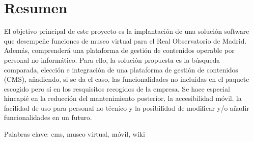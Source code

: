 \section{Resumen}

\par El objetivo principal de este proyecto es la implantación de una solución software que desempeñe funciones de museo virtual para el Real Observatorio de Madrid. Además, comprenderá una plataforma de gestión de contenidos operable por personal no informático.
Para ello, la solución propuesta es la búsqueda comparada, elección e integración de una plataforma de gestión de contenidos (CMS), añadiendo, si se da el caso, las funcionalidades no incluidas en el paquete escogido pero sí en los resquisitos recogidos de la empresa.
Se hace especial hincapié en la reducción del mantenimiento posterior, la accesibilidad móvil, la facilidad de uso para personal no técnico y la posibilidad de modificar y/o añadir funcionalidades en un futuro.

\par Palabras clave: cms, museo virtual, móvil, wiki